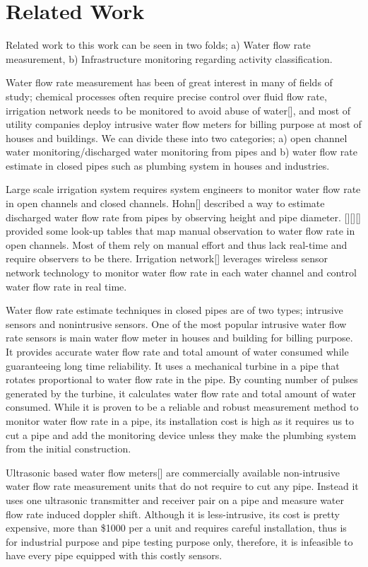 \section{Related Work}
  \label{sec:relatedwork}
Related work to this work can be seen in two folds; a) Water flow rate measurement, b) Infrastructure monitoring regarding activity classification.

Water flow rate measurement has been of great interest in many of fields of study; chemical processes often require precise control over fluid flow rate, irrigation network needs to be monitored to avoid abuse of water[], and most of utility companies deploy intrusive water flow meters for billing purpose at most of houses and buildings. We can divide these into two categories; a) open channel water monitoring/discharged water monitoring from pipes and b) water flow rate estimate in closed pipes such as plumbing system in houses and industries.  

Large scale irrigation system requires system engineers to monitor water flow rate in open channels and closed channels. Hohn[] described a way to estimate discharged water flow rate from pipes by observing height and pipe diameter. [][][] provided some look-up tables that map manual observation to water flow rate in open channels. Most of them rely on manual effort and thus lack real-time and require observers to be there. Irrigation network[] leverages wireless sensor network technology to monitor water flow rate in each water channel and control water flow rate in real time. 

Water flow rate estimate techniques in closed pipes are of two types; intrusive sensors and nonintrusive sensors. One of the most popular intrusive water flow rate sensors is main water flow meter in houses and building for billing purpose. It provides accurate water flow rate and total amount of water consumed while guaranteeing long time reliability. It uses a mechanical turbine in a pipe that rotates proportional to water flow rate in the pipe. By counting number of pulses generated by the turbine, it calculates water flow rate and total amount of water consumed. While it is proven to be a reliable and robust measurement method to monitor water flow rate in a pipe, its installation cost is high as it requires us to cut a pipe and add the monitoring device unless they make the plumbing system from the initial construction. 

Ultrasonic based water flow meters[] are commercially available non-intrusive water flow rate measurement units that do not require to cut any pipe. Instead it uses one ultrasonic transmitter and receiver pair on a pipe and measure water flow rate induced doppler shift. Although it is less-intrusive, its cost is pretty expensive, more than \$1000 per a unit and requires careful installation, thus is for industrial purpose and pipe testing purpose only, therefore, it is infeasible to have every pipe equipped with this costly sensors.

